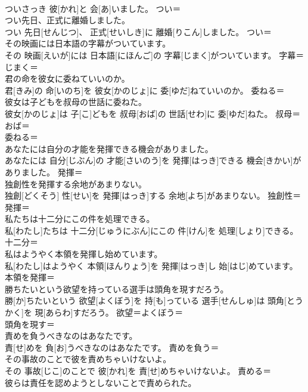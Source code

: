 \documentclass[8pt]{extreport}
\begin{document}
\begin{CJK}{UTF8}{min}
\\	ついさっき 彼[かれ]と 会[あ]いました。	つい＝ 
\\	つい先日、正式に離婚しました。	
\\	つい 先日[せんじつ]、 正式[せいしき]に 離婚[りこん]しました。	つい＝ 
\\	その映画には日本語の字幕がついています。	
\\	その 映画[えいが]には 日本語[にほんご]の 字幕[じまく]がついています。	字幕＝じまく＝ 
\\	君の命を彼女に委ねていいのか。	
\\	君[きみ]の 命[いのち]を 彼女[かのじょ]に 委[ゆだ]ねていいのか。	委ねる＝ 
\\	彼女は子どもを叔母の世話に委ねた。	
\\	彼女[かのじょ]は 子[こ]どもを 叔母[おば]の 世話[せわ]に 委[ゆだ]ねた。	叔母＝おば＝ 
\\	委ねる＝ 
\\	あなたには自分の才能を発揮できる機会がありました。	
\\	あなたには 自分[じぶん]の 才能[さいのう]を 発揮[はっき]できる 機会[きかい]がありました。	発揮＝ 
\\	独創性を発揮する余地があまりない。	
\\	独創[どくそう] 性[せい]を 発揮[はっき]する 余地[よち]があまりない。	独創性＝ 
\\	発揮＝ 
\\	私たちは十二分にこの件を処理できる。	
\\	私[わたし]たちは 十二分[じゅうにぶん]にこの 件[けん]を 処理[しょり]できる。	十二分＝ 
\\	私はようやく本領を発揮し始めています。	
\\	私[わたし]はようやく 本領[ほんりょう]を 発揮[はっき]し 始[はじ]めています。	本領を発揮＝ 
\\	勝ちたいという欲望を持っている選手は頭角を現すだろう。	
\\	勝[か]ちたいという 欲望[よくぼう]を 持[も]っている 選手[せんしゅ]は 頭角[とうかく]を 現[あらわ]すだろう。	欲望＝よくぼう＝ 
\\	頭角を現す＝ 
\\	責めを負うべきなのはあなたです。	
\\	責[せ]めを 負[お]うべきなのはあなたです。	責めを負う＝ 
\\	その事故のことで彼を責めちゃいけないよ。	
\\	その 事故[じこ]のことで 彼[かれ]を 責[せ]めちゃいけないよ。	責める＝ 
\\	彼らは責任を認めようとしないことで責められた。	

\end{CJK}
\end{document}
